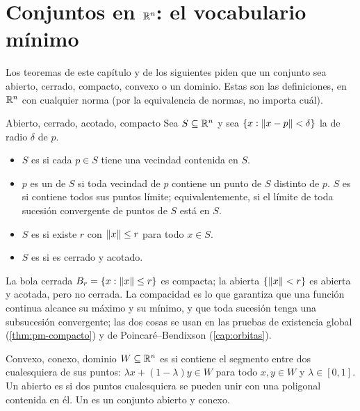 \section{Conjuntos en \texorpdfstring{$\mathbb{R}^n$}{Rn}: el vocabulario mínimo}
\label{sec:pm-conjuntos}

Los teoremas de este capítulo y de los siguientes piden que un conjunto sea abierto, cerrado, compacto, convexo o un dominio. Estas son las definiciones, en $\mathbb{R}^n$ con cualquier norma (por la equivalencia de normas, no importa cuál).

\begin{definicion}[label=def:pm-conjuntos]{Abierto, cerrado, acotado, compacto}
Sea $S\subseteq\mathbb{R}^n$ y sea $\{x:\left\lVert x-p\right\rVert<\delta\}$ la  de radio $\delta$ de $p$.
\begin{itemize}
  \item $S$ es  si cada $p\in S$ tiene una vecindad contenida en $S$.
  \item $p$ es un  de $S$ si toda vecindad de $p$ contiene un punto de $S$ distinto de $p$. $S$ es  si contiene todos sus puntos límite; equivalentemente, si el límite de toda sucesión convergente de puntos de $S$ está en $S$.
  \item $S$ es  si existe $r$ con $\left\lVert x\right\rVert\le r$ para todo $x\in S$.
  \item $S$ es  si es cerrado y acotado.
\end{itemize}
\end{definicion}

La bola cerrada $B_{r}=\{x:\left\lVert x\right\rVert\le r\}$ es compacta; la abierta $\{\left\lVert x\right\rVert<r\}$ es abierta y acotada, pero no cerrada. La compacidad es lo que garantiza que una función continua alcance su máximo y su mínimo, y que toda sucesión tenga una subsucesión convergente; las dos cosas se usan en las pruebas de existencia global (\cref{thm:pm-compacto}) y de Poincaré--Bendixson (\cref{cap:orbitas}).

\begin{definicion}[label=def:pm-convexo]{Convexo, conexo, dominio}
$W\subseteq\mathbb{R}^n$ es  si contiene el segmento entre dos cualesquiera de sus puntos: $\lambda x+(1-\lambda)y\in W$ para todo $x,y\in W$ y $\lambda\in[0,1]$. Un abierto es  si dos puntos cualesquiera se pueden unir con una poligonal contenida en él. Un  es un conjunto abierto y conexo.
\end{definicion}

